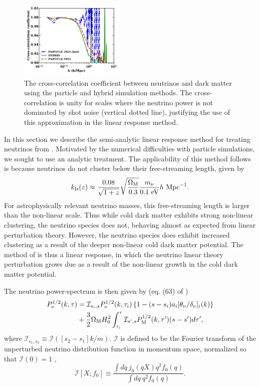 \documentclass[useAMS, usenatbib]{mnras}
\begin{document}
\begin{figure}
\includegraphics[width=0.45\textwidth]{nuplots/corr_coeff-1.pdf}
  \caption{The cross-correlation coefficient between neutrinos and dark matter using the particle and hybrid simulation methods.
  The cross-correlation is unity for scales where the neutrino power is not dominated by shot noise (vertical dotted line), justifying the use of
  this approximation in the linear response method.
  }
  \label{fig:cross-corr}
\end{figure}

In this section we describe the semi-analytic linear response method for treating neutrinos from \cite{AHB}.
Motivated by the numerical difficulties with particle simulations, we sought to use an analytic treatment.
The applicability of this method follows is because neutrinos do not cluster below their free-streaming length, given by
\begin{equation}
 k_{\rm fs}(z) \approx \frac{0.08}{\sqrt{1+z}}
\sqrt{\frac{\Omega_{\rm M}}{0.3}} \frac{m_{\nu}}{0.1 ~ \textrm{eV}} h~ \textrm{Mpc}^{-1}.
\label{eq:kfs}
\end{equation}
For astrophysically relevant neutrino masses, this free-streaming length is larger than the non-linear scale.
Thus while cold dark matter exhibits strong non-linear clustering, the neutrino species does not, behaving
almost as expected from linear perturbation theory. However, the neutrino species does exhibit increased clustering
as a result of the deeper non-linear cold dark matter potential. The method of \cite{AHB} is thus a linear response,
in which the neutrino linear theory perturbation grows due as a result of the non-linear growth in the cold dark matter potential.

The neutrino power-spectrum is then given by (eq. (63) of \cite{AHB})
\begin{align}
P_{\nu}^{1/2}(k, \tau) &= \mathcal{I}_{s_i, s}
P_{\nu}^{1/2}(k, \tau_i) \left\{1 - (s - s_i)  a_i [\theta_{\nu}/\delta_{\nu}]_{i}(k)\right\}\nonumber\\
&+ \frac32 \Omega_{\rm M} H_0^2 \int_{\tau_i}^{\tau} \mathcal{I}_{s', s}
P^{1/2}_{\rm M}(k, \tau') (s - s')d \tau', \label{eq:P-final}
\end{align}
where $\mathcal{I}_{s_1, s_2} \equiv \mathcal{I}([s_2 -s_1]k/m)$. $\mathcal{I}$ is defined to be
the Fourier transform of the unperturbed neutrino distribution function in momentum space, normalized so
that $\mathcal{I}(0) = 1$ \citep{Brandenberger_1987, Bertschinger_Watts_1988},
\begin{equation}
\mathcal{I}[X; f_0] \equiv \frac{\int dq~ j_0(q X) q^2 f_0(q) }{\int dq ~q^2 f_0(q)}. \label{eq:I.def}
\end{equation}
\end{document}
